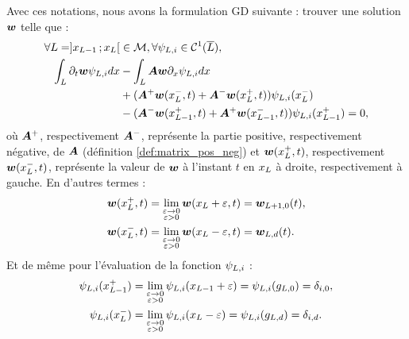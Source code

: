 Avec ces notations, nous avons la formulation GD suivante : 
trouver une solution $\bm{w}$ telle que :
\begin{equation}
	\begin{aligned}
	\forall L = \rbrack x_{L - 1}\,;x_{L}\lbrack &\in \mathcal{M} ,
	\forall \psi_{L,i} \in \mathcal{C}^1(\overline{L}), \\
		\int_{L} \partial_{t} \bm{w} \psi_{L,i} dx
		&- \int_{L} \bm{A} \bm{w} \partial_{x} \psi_{L,i} dx \\
		&+ (\bm{A}^{+} \bm{w}(x_{L}^{-},t) +
			\bm{A}^{-} \bm{w}(x_{L}^{+},t))
			\psi_{L,i} (x_{L}^{-}) \\
		&- (\bm{A}^{-} \bm{w}(x_{L - 1}^{+},t) +
			\bm{A}^{+} \bm{w}(x_{L - 1}^{-},t))
			\psi_{L,i} (x_{L - 1}^{+}) = 0 ,
	\end{aligned}
\end{equation}
où $\bm{A}^{+}$, respectivement $\bm{A}^{-}$, représente
la partie positive, respectivement négative, de $\bm{A}$
(définition \ref{def:matrix_pos_neg})
et $\bm{w}(x_{L}^{+},t)$, respectivement $\bm{w}(x_{L}^{-},t)$, représente
la valeur de $\bm{w}$ à l'instant $t$ en $x_{L}$ à droite,
respectivement à gauche.
En d'autres termes :
\begin{subequations}
	\begin{align}
		\bm{w}(x_{L}^{+},t) &=
		\lim\limits_{\substack{\varepsilon \rightarrow 0 \\ \varepsilon > 0}}
		\bm{w}(x_{L} + \varepsilon,t) = \bm{w}_{L+1,0}(t) , \\
		\bm{w}(x_{L}^{-},t) &=
		\lim\limits_{\substack{\varepsilon \rightarrow 0 \\ \varepsilon > 0}}
		\bm{w}(x_{L} - \varepsilon,t) = \bm{w}_{L,d}(t) .
	\end{align} 
\end{subequations}
Et de même pour l'évaluation de la fonction $\psi_{L,i}$ :
\begin{subequations}
	\begin{align}
		\psi_{L,i} (x_{L-1}^{+}) &=
		\lim\limits_{\substack{\varepsilon \rightarrow 0 \\ \varepsilon > 0}}
		\psi_{L,i} (x_{L-1} + \varepsilon) =
		\psi_{L,i} (g_{L,0}) = \delta_{i,0} , \\
		\psi_{L,i} (x_{L}^{-}) &=
		\lim\limits_{\substack{\varepsilon \rightarrow 0 \\ \varepsilon > 0}}
		\psi_{L,i}(x_{L} - \varepsilon) =
		\psi_{L,i} (g_{L,d}) = \delta_{i,d} .
	\end{align} 
\end{subequations}

